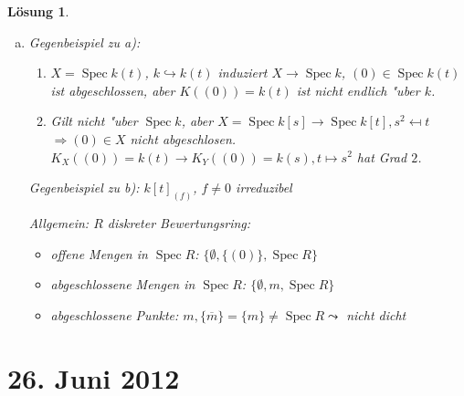 \documentclass[paper = A4, fontsize=12pt, numbers=noendperiod, chapterprefix=true]{scrbook}
\theoremstyle{break}
\newtheorem{Loes}{L\"osung}
\theoremstyle{nonumberbreak}
\theoremstyle{nonumberplain}
\newcommand{\quot}[1]{\textrm{\glqq}{#1}\textrm{\grqq}}
\newenvironment{twosidedproof}{\begin{enumerate}[\quot{$\Rightarrow$}:]}{\end{enumerate}}
\newcommand{\proofforward}{\item[\quot{$\Rightarrow$}:]}
\newcommand{\proofreverse}{\item[\quot{$\Leftarrow$}:]}
\DeclareMathOperator{\Spec}{Spec}
\newcommand{\FakRaum}[2]{
	\raisebox{0.7ex}{\ensuremath{#1}}
	\ensuremath{\mkern-3mu}\big/\ensuremath{\mkern-3mu}
	\raisebox{-0.6ex}{\ensuremath{#2}}}
\begin{document}
\begin{Loes}
\begin{enumerate}[a)]
	\emph{Zeige:} F"ur eine Basis der Topologie: Jede Basismenge enth"alt abgeschlossene Punkte $D(f) \subseteq U_i \subseteq X$ offen, affin bilden Basen.
	
	Sei also $\Spec(A_{if}) = D(f) \subseteq U_i \subseteq X$ offen. $X \to \Spec k$ von endlichem Typ $\Rightarrow A_i$ endlich erzeugte $k$-Algebra, $R := A_{if}$ endlich erzeugte $k$-Algebra. $R$ enth"alt maximales Ideal $m$. $\xRightarrow{\text{HNS}} K(x) = \FakRaum{R}{m}$ ist endliche K"orpererweiterung $\xRightarrow{\text{(a)}} m$ bgeschlossener Punkt.
\item
	Gegenbeispiel zu a):
	\begin{twosidedproof}
	\proofforward
		$X = \Spec k(t)$, $k \hookrightarrow k(t)$ induziert $X \to \Spec k$, $(0) \in \Spec k(t)$ ist abgeschlossen, aber $K((0)) = k(t)$ ist nicht endlich "uber $k$.
	\proofreverse
		Gilt nicht "uber $\Spec k$, aber $X = \Spec k[s] \to \Spec k[t], s^2 \mapsfrom t$ $\Rightarrow (0) \in X$ nicht abgeschlosen. $K_X((0)) = k(t) \to K_Y((0)) = k(s), t \mapsto s^2$ hat Grad $2$.
	\end{twosidedproof}
	Gegenbeispiel zu b): $k[t]_{(f)}$, $f \ne 0$ irreduzibel
	
	Allgemein: $R$ diskreter Bewertungsring:
	\begin{itemize}
	\item
		offene Mengen in $\Spec R$: $\{ \emptyset, \{(0)\}, \Spec R\}$
	\item
		abgeschlossene Mengen in $\Spec R$: $\{ \emptyset, m, \Spec R\}$
	\item
		abgeschlossene Punkte: $m, \{\overline m\} = \{m\} \ne \Spec R \leadsto$ nicht dicht
	\end{itemize}
\end{enumerate}\end{Loes}

\newpage
\section{26. Juni 2012}
\setcounter{Aufg}{0}
\setcounter{Loes}{0}
\end{document}
